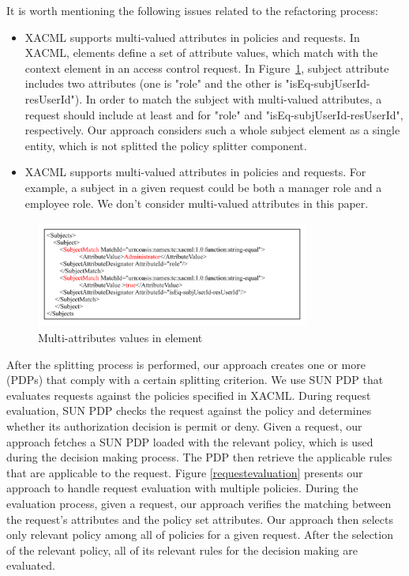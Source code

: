 It is worth mentioning the following issues related to the refactoring process:
\begin{itemize}
\item
XACML supports multi-valued attributes in policies and requests. In XACML,  elements define a set of attribute values, which match with the context element in
an access control request. In Figure~\ref{xacml-match}, subject attribute includes two attributes (one is "role" and the other is "isEq-subjUserId-resUserId"). In order to 
match the subject with multi-valued attributes, a request should include at least  and  for "role" and "isEq-subjUserId-resUserId", respectively.
Our approach considers such a whole subject element as a single entity, which is not splitted the policy splitter component.
\item XACML supports multi-valued attributes in policies and requests. For example, a subject in a given request could be both a manager role and a employee role. 
We don't consider multi-valued attributes in this paper.
\end{itemize}

\begin{figure}[!h]
\begin{center}
\includegraphics[width=9cm, height=3.5cm]{xacml-match}
\caption{Multi-attributes values in  element}
\label{xacml-match}
\end{center}
\end{figure}

After the splitting process is performed, our approach creates one or more (PDPs) that comply with a certain splitting criterion.
We use SUN PDP \cite{sunxacml} that evaluates requests against the policies specified in XACML.
During request evaluation, SUN PDP checks the request against the policy and determines whether its authorization
decision is permit or deny. Given a request, our approach fetches a SUN PDP loaded with the relevant policy, which is used during the decision making process. 
The PDP then retrieve the applicable rules that are applicable to the request.
Figure \ref{requestevaluation} presents our approach to handle request evaluation with multiple policies.
During the evaluation process, given a request, our approach verifies the matching between the request's attributes
and the policy set attributes. Our approach then selects only relevant policy among all of policies for a given request.
After the selection of the relevant policy, all of its relevant rules for the decision making are evaluated.


